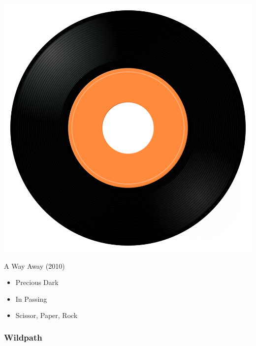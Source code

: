 \begin{minipage}[t]{0.25\textwidth}
\captionsetup{type=figure}
\includegraphics[width=\textwidth]{Images/cover.png}
\caption*{A Way Away (2010)}
\end{minipage}
\begin{minipage}[t]{0.25\textwidth}\vspace{0pt}
\begin{itemize}[nosep,leftmargin=1em,labelwidth=*,align=left]
	\setlength{\itemsep}{0pt}
	\item Precious Dark
	\item In Passing
	\item Scissor, Paper, Rock
\end{itemize}
\end{minipage}

\subsubsection{Wildpath}

